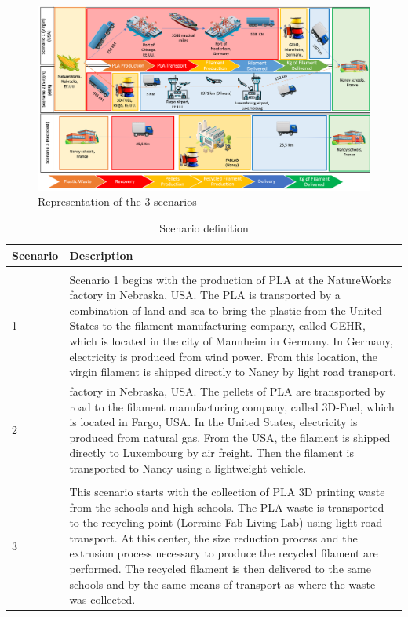 \documentclass[12pt]{elsarticle} %
\begin{document}
\begin{figure}[H]

{\centering \includegraphics[width=0.9\linewidth,]{Figures/Scenarios} 

}

\caption{Representation of the 3 scenarios}\label{fig:figure}
\end{figure}

\begingroup\fontsize{9}{11}\selectfont

\begin{longtable}[t]{>{\raggedright\arraybackslash}p{1cm}>{\raggedright\arraybackslash}p{14cm}}
\caption{\label{tab:Table1}Scenario definition}\\
\toprule
Scenario & Description\\
\midrule
\addlinespace[1em]
\multicolumn{2}{l}{\textbf{Virgin Filament}}\\
\hspace{1em}1 & Scenario 1 begins with the production of PLA at the NatureWorks factory in Nebraska, USA. The PLA is transported by a combination of land and sea to bring the plastic from the United States to the filament manufacturing company, called GEHR, which is located in the city of Mannheim in Germany. In Germany, electricity is produced from wind power. From this location, the virgin filament is shipped directly to Nancy by light road transport.\\
\hspace{1em}2 & factory in Nebraska, USA. The pellets of PLA are transported by road to the filament manufacturing company, called 3D-Fuel, which is located in Fargo, USA. In the United States, electricity is produced from natural gas. From the USA, the filament is shipped directly to Luxembourg by air freight. Then the filament is transported to Nancy using a lightweight vehicle.\\
\midrule
\addlinespace[1em]
\multicolumn{2}{l}{\textbf{Recycled Filament}}\\
\hspace{1em}3 & This scenario starts with the collection of PLA 3D printing waste from the schools and high schools. The PLA waste is transported to the recycling point (Lorraine Fab Living Lab) using light road transport. At this center, the size reduction process and the extrusion process necessary to produce the recycled filament are performed. The recycled filament is then delivered to the same schools and by the same means of transport as where the waste was collected.\\
\bottomrule
\end{longtable}
\endgroup{}
\end{document}
